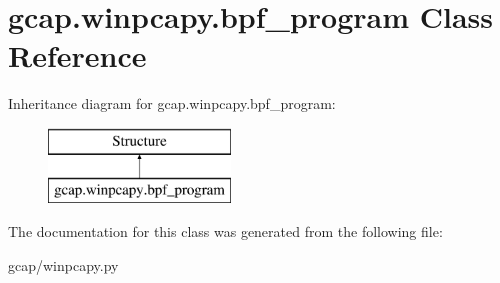 \hypertarget{classgcap_1_1winpcapy_1_1bpf__program}{}\section{gcap.\+winpcapy.\+bpf\+\_\+program Class Reference}
\label{classgcap_1_1winpcapy_1_1bpf__program}
Inheritance diagram for gcap.\+winpcapy.\+bpf\+\_\+program\+:\begin{figure}[H]
\begin{center}
\leavevmode
\includegraphics[height=2.000000cm]{d1/dd0/classgcap_1_1winpcapy_1_1bpf__program}
\end{center}
\end{figure}


The documentation for this class was generated from the following file\+:\begin{DoxyCompactItemize}
\item 
gcap/winpcapy.\+py\end{DoxyCompactItemize}

